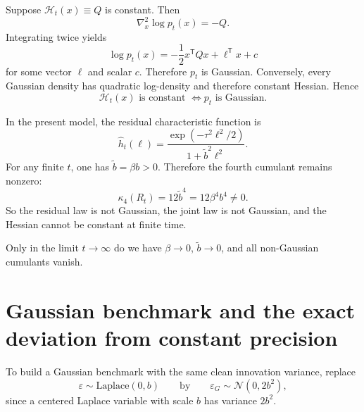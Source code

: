 \documentclass[11pt]{article}
\newcommand{\1}{\mathbf{1}}
\newcommand{\trans}{^{\mathsf T}}
\newcommand{\pt}{p_t}
\newcommand{\curv}{\mathcal{H}}
\newcommand{\Laplace}{\mathrm{Laplace}}
\newcommand{\Normal}{\mathcal{N}}
\theoremstyle{definition}
\begin{document}
Suppose \(\curv_t(x)\equiv Q\) is constant. Then
\begin{equation}
\nabla_x^2 \log \pt(x) = -Q.
\end{equation}
Integrating twice yields
\begin{equation}
\log \pt(x)= -\frac{1}{2}x\trans Q x + \ell\trans x + c
\end{equation}
for some vector \(\ell\) and scalar \(c\). Therefore \(\pt\) is Gaussian. Conversely, every Gaussian density has quadratic log-density and therefore constant Hessian. Hence
\begin{equation}
\label{eq:constant-hessian-iff-gaussian}
\boxed{\curv_t(x)\text{ is constant }\Longleftrightarrow \pt\text{ is Gaussian.}}
\end{equation}

In the present model, the residual characteristic function is
\begin{equation}
\widehat h_t(\ell)=\frac{\exp(-\tau^2\ell^2/2)}{1+\tilde b^2\ell^2}.
\end{equation}
For any finite \(t\), one has \(\tilde b=\beta b>0\). Therefore the fourth cumulant remains nonzero:
\begin{equation}
\kappa_4(R_t)=12\tilde b^4=12\beta^4 b^4\neq 0.
\end{equation}
So the residual law is not Gaussian, the joint law is not Gaussian, and the Hessian cannot be constant at finite time.

Only in the limit \(t\to \infty\) do we have \(\beta\to 0\), \(\tilde b\to 0\), and all non-Gaussian cumulants vanish.

\section{Gaussian benchmark and the exact deviation from constant precision}

To build a Gaussian benchmark with the same clean innovation variance, replace
\begin{equation}
\varepsilon \sim \Laplace(0,b)
\qquad \text{by} \qquad
\varepsilon_G \sim \Normal(0,2b^2),
\end{equation}
since a centered Laplace variable with scale \(b\) has variance \(2b^2\).
\end{document}
